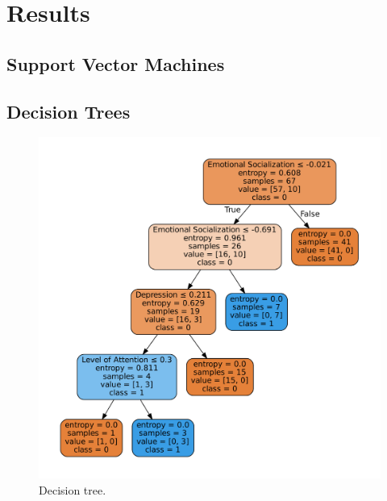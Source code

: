 \documentclass[conference]{IEEEtran}
\theoremstyle{definition}
\theoremstyle{remark}
\theoremstyle{remark}
\begin{document}
\section{Results}\label{sec:res}
\subsection{Support Vector Machines}

\subsection{Decision Trees}
\begin{figure}
    \includegraphics[width=\columnwidth]{figs/tree-graph.pdf}
    \caption{Decision tree.}
    \label{fig:dt}
\end{figure}
\end{document}
